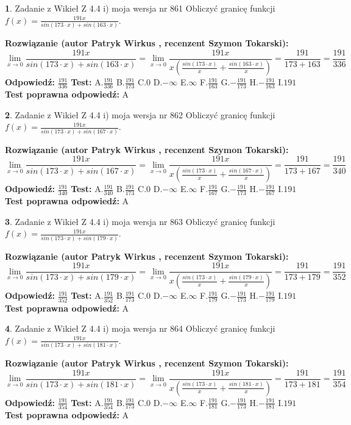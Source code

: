 \documentclass[12pt, a4paper]{article}
\theoremstyle{definition} %
\newtheorem{zad}{}
\newcommand{\zadStart}[1]{\begin{zad}#1\newline}
\newcommand{\zadStop}{\end{zad}}
\newcommand{\rozwStart}[2]{\noindent \textbf{Rozwiązanie (autor #1 , recenzent #2): }\newline}
\newcommand{\rozwStop}{\newline}
\newcommand{\odpStart}{\noindent \textbf{Odpowiedź:}\newline}
\newcommand{\odpStop}{\newline}
\newcommand{\testStart}{\noindent \textbf{Test:}\newline}
\newcommand{\testStop}{\newline}
\newcommand{\kluczStart}{\noindent \textbf{Test poprawna odpowiedź:}\newline}
\newcommand{\kluczStop}{\newline}
\begin{document}
\zadStart{Zadanie z Wikieł Z 4.4 i) moja wersja nr 861}
Obliczyć granicę funkcji $f(x)=\frac{191x}{sin(173\cdot x) +sin(163\cdot x)}$.
\zadStop
\rozwStart{Patryk Wirkus}{Szymon Tokarski}
$$\lim\limits_{x\to 0}\frac{191x}{sin(173\cdot x) +sin(163\cdot x)}=\lim\limits_{x\to 0}\frac{191x}{x(\frac{sin(173\cdot x)}{x}+\frac{sin(163\cdot x)}{x})}=\frac{191}{173+163} = \frac{191}{336}$$
\rozwStop
\odpStart
$\frac{191}{336}$
\odpStop
\testStart
A.$\frac{191}{336}$
B.$\frac{191}{173}$
C.$0$
D.$-\infty$
E.$\infty$
F.$\frac{191}{163}$
G.$-\frac{191}{173}$
H.$-\frac{191}{163}$
I.$191$
\testStop
\kluczStart
A
\kluczStop



\zadStart{Zadanie z Wikieł Z 4.4 i) moja wersja nr 862}
Obliczyć granicę funkcji $f(x)=\frac{191x}{sin(173\cdot x) +sin(167\cdot x)}$.
\zadStop
\rozwStart{Patryk Wirkus}{Szymon Tokarski}
$$\lim\limits_{x\to 0}\frac{191x}{sin(173\cdot x) +sin(167\cdot x)}=\lim\limits_{x\to 0}\frac{191x}{x(\frac{sin(173\cdot x)}{x}+\frac{sin(167\cdot x)}{x})}=\frac{191}{173+167} = \frac{191}{340}$$
\rozwStop
\odpStart
$\frac{191}{340}$
\odpStop
\testStart
A.$\frac{191}{340}$
B.$\frac{191}{173}$
C.$0$
D.$-\infty$
E.$\infty$
F.$\frac{191}{167}$
G.$-\frac{191}{173}$
H.$-\frac{191}{167}$
I.$191$
\testStop
\kluczStart
A
\kluczStop



\zadStart{Zadanie z Wikieł Z 4.4 i) moja wersja nr 863}
Obliczyć granicę funkcji $f(x)=\frac{191x}{sin(173\cdot x) +sin(179\cdot x)}$.
\zadStop
\rozwStart{Patryk Wirkus}{Szymon Tokarski}
$$\lim\limits_{x\to 0}\frac{191x}{sin(173\cdot x) +sin(179\cdot x)}=\lim\limits_{x\to 0}\frac{191x}{x(\frac{sin(173\cdot x)}{x}+\frac{sin(179\cdot x)}{x})}=\frac{191}{173+179} = \frac{191}{352}$$
\rozwStop
\odpStart
$\frac{191}{352}$
\odpStop
\testStart
A.$\frac{191}{352}$
B.$\frac{191}{173}$
C.$0$
D.$-\infty$
E.$\infty$
F.$\frac{191}{179}$
G.$-\frac{191}{173}$
H.$-\frac{191}{179}$
I.$191$
\testStop
\kluczStart
A
\kluczStop



\zadStart{Zadanie z Wikieł Z 4.4 i) moja wersja nr 864}
Obliczyć granicę funkcji $f(x)=\frac{191x}{sin(173\cdot x) +sin(181\cdot x)}$.
\zadStop
\rozwStart{Patryk Wirkus}{Szymon Tokarski}
$$\lim\limits_{x\to 0}\frac{191x}{sin(173\cdot x) +sin(181\cdot x)}=\lim\limits_{x\to 0}\frac{191x}{x(\frac{sin(173\cdot x)}{x}+\frac{sin(181\cdot x)}{x})}=\frac{191}{173+181} = \frac{191}{354}$$
\rozwStop
\odpStart
$\frac{191}{354}$
\odpStop
\testStart
A.$\frac{191}{354}$
B.$\frac{191}{173}$
C.$0$
D.$-\infty$
E.$\infty$
F.$\frac{191}{181}$
G.$-\frac{191}{173}$
H.$-\frac{191}{181}$
I.$191$
\testStop
\kluczStart
A
\kluczStop
\end{document}

